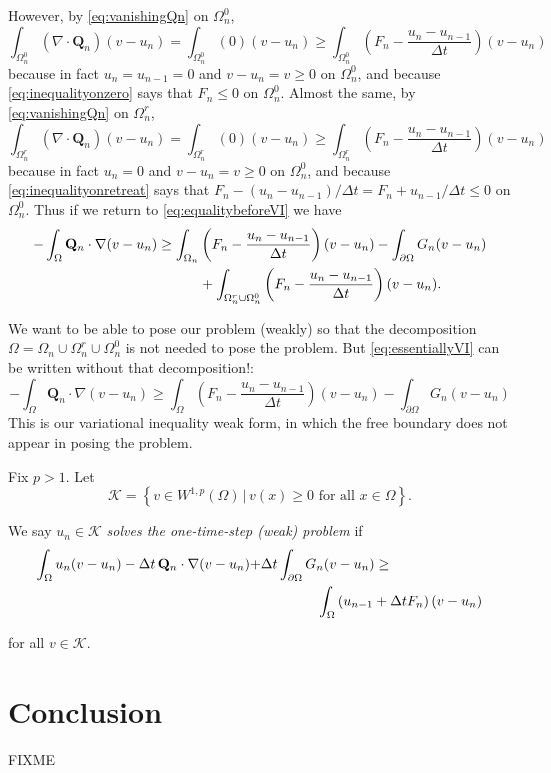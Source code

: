 \documentclass[final,leqno,onefignum,onetabnum]{siamltex1213bueler}
\newcommand\bQ{\mathbf{Q}}
\newcommand{\Div}{\nabla\cdot}
\renewcommand{\grad}{\nabla}
\begin{document}
However, by \eqref{eq:vanishingQn} on $\Omega_n^0$,
    $$\int_{\Omega_n^0} (\Div \bQ_n) (v-u_n) = \int_{\Omega_n^0} (0) (v-u_n) \ge \int_{\Omega_n^0} \left(F_n - \frac{u_n - u_{n-1}}{\Delta t}\right) (v-u_n)$$
because in fact $u_n=u_{n-1}=0$ and $v-u_n = v \ge 0$ on $\Omega_n^0$, and because \eqref{eq:inequalityonzero} says that $F_n \le 0$ on $\Omega_n^0$.  Almost the same, by \eqref{eq:vanishingQn} on $\Omega_n^r$,
    $$\int_{\Omega_n^r} (\Div \bQ_n) (v-u_n) = \int_{\Omega_n^r} (0) (v-u_n) \ge \int_{\Omega_n^r} \left(F_n - \frac{u_n - u_{n-1}}{\Delta t}\right) (v-u_n)$$
because in fact $u_n=0$ and $v-u_n = v \ge 0$ on $\Omega_n^0$, and because \eqref{eq:inequalityonretreat} says that $F_n - (u_n - u_{n-1})/\Delta t = F_n + u_{n-1}/\Delta t \le 0$ on $\Omega_n^0$.  Thus if we return to \eqref{eq:equalitybeforeVI} we have
\begin{align}
-\int_{\Omega} \bQ_n \cdot \grad(v-u_n) &\ge \int_{\Omega_n} \left(F_n - \frac{u_n - u_{n-1}}{\Delta t}\right) (v-u_n) - \int_{\partial \Omega} G_n (v-u_n) \label{eq:essentiallyVI} \\
  &\qquad\quad + \int_{\Omega_n^r \cup \Omega_n^0} \left(F_n - \frac{u_n - u_{n-1}}{\Delta t}\right) (v-u_n). \notag
\end{align}

We want to be able to pose our problem (weakly) so that the decomposition $\Omega = \Omega_n \cup \Omega_n^r \cup \Omega_n^0$ is not needed to pose the problem.  But \eqref{eq:essentiallyVI} can be written without that decomposition!:
\begin{equation}
-\int_{\Omega} \bQ_n \cdot \grad(v-u_n) \ge \int_{\Omega} \left(F_n - \frac{u_n - u_{n-1}}{\Delta t}\right) (v-u_n) - \int_{\partial \Omega} G_n (v-u_n) \label{eq:morallytheVI}
\end{equation}
This is our variational inequality weak form, in which the free boundary does not appear in posing the problem.

\begin{definition}  Fix $p>1$.  Let
    $$\mathcal{K} = \left\{v \in W^{1,p}(\Omega) \,\big|\, v(x) \ge 0 \text{ for all } x \in \Omega\right\}.$$
\end{definition}

\begin{definition}  We say $u_n \in \mathcal{K}$ \emph{solves the one-time-step (weak) problem} if 
\begin{align}
\int_{\Omega} u_n (v-u_n) - \Delta t\, \bQ_n \cdot \grad(v-u_n) + &\Delta t \int_{\partial \Omega} G_n (v-u_n) \ge \label{eq:theVI} \\
  &\qquad\qquad \int_{\Omega} \left(u_{n-1} + \Delta t F_n\right) (v-u_n) \notag
\end{align}
\end{definition}
for all $v \in \mathcal{K}$.



\section{Conclusion}  FIXME





\end{document}
